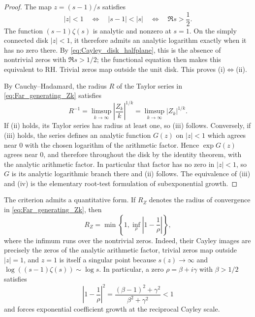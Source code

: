 \documentclass[11pt]{amsart}
\numberwithin{equation}{section}
\theoremstyle{plain}
\theoremstyle{definition}
\theoremstyle{remark}
\newcommand{\RH}{\mathrm{RH}}
\begin{document}
\begin{proof}
The map $z=(s-1)/s$ satisfies
\begin{equation}
 |z|<1
 \quad\Longleftrightarrow\quad
 |s-1|<|s|
 \quad\Longleftrightarrow\quad
 \Re s>\frac12.
 \label{eq:Cayley_disk_halfplane}
\end{equation}
The function $(s-1)\zeta(s)$ is analytic and nonzero at $s=1$.  On the simply connected disk $|z|<1$, it therefore admits an analytic logarithm exactly when it has no zero there.  By \eqref{eq:Cayley_disk_halfplane}, this is the absence of nontrivial zeros with $\Re s>1/2$; the functional equation then makes this equivalent to $\RH$.  Trivial zeros map outside the unit disk.  This proves (i)$\Longleftrightarrow$(ii).

By Cauchy--Hadamard, the radius \(R\) of the Taylor series in
\eqref{eq:Far_generating_Zk} satisfies
\begin{equation}
 R^{-1}
 =\limsup_{k\to\infty}
 \left|\frac{Z_k}{k}\right|^{1/k}
 =\limsup_{k\to\infty}|Z_k|^{1/k}.
 \label{eq:Zk_Cauchy_Hadamard}
\end{equation}
If (ii) holds, its Taylor series has radius at least one, so (iii) follows.  Conversely,
if (iii) holds, the series defines an analytic function \(G(z)\) on \(|z|<1\) which
agrees near \(0\) with the chosen logarithm of the arithmetic factor.  Hence
\(\exp G(z)\) agrees near \(0\), and therefore throughout the disk by the identity theorem,
with the analytic arithmetic factor.  In particular that factor has no zero in \(|z|<1\),
so \(G\) is its analytic logarithmic branch there and (ii) follows.  The equivalence of
(iii) and (iv) is the elementary root-test formulation of subexponential growth.
\end{proof}

The criterion admits a quantitative form.  If $R_Z$ denotes the radius of convergence in \eqref{eq:Far_generating_Zk}, then
\begin{equation}
 \boxed{
 R_Z
 =\min\left\{1,
 \inf_{\rho}\left|1-\frac1\rho\right|\right\},}
 \label{eq:Zk_radius_zero_geometry}
\end{equation}
where the infimum runs over the nontrivial zeros.  Indeed, their Cayley images are precisely the zeros of the analytic arithmetic factor, trivial zeros map outside $|z|=1$, and $z=1$ is itself a singular point because $s(z)\to\infty$ and $\log((s-1)\zeta(s))\sim\log s$.  In particular, a zero $\rho=\beta+i\gamma$ with $\beta>1/2$ satisfies
\begin{equation}
 \left|1-\frac1\rho\right|^2
 =\frac{(\beta-1)^2+\gamma^2}{\beta^2+\gamma^2}<1
 \label{eq:off_line_zero_inside_disk}
\end{equation}
and forces exponential coefficient growth at the reciprocal Cayley scale.
\end{document}
